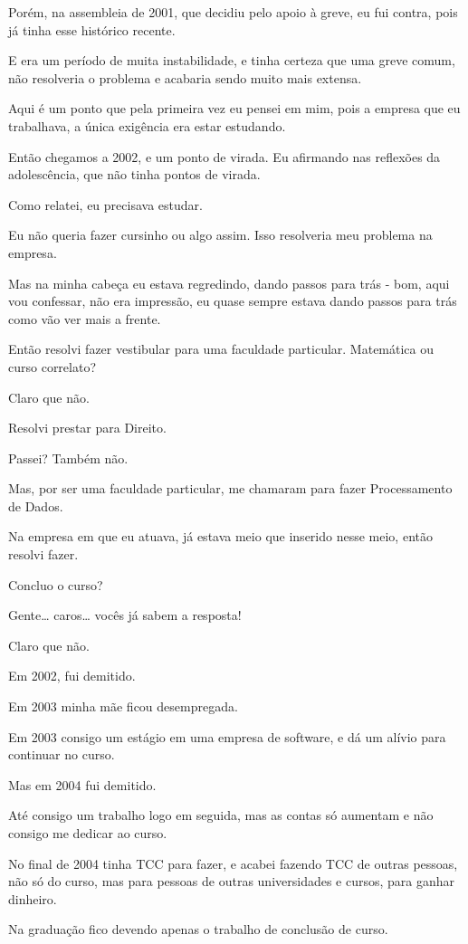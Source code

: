 Porém, na assembleia de 2001, que decidiu pelo apoio à greve, eu fui contra, pois já tinha esse histórico recente. 

E era um período de muita instabilidade, e tinha certeza que uma greve comum, não resolveria o problema e acabaria sendo muito mais extensa. 

Aqui é um ponto que pela primeira vez eu pensei em mim, pois a empresa que eu trabalhava, a única exigência era estar estudando.

Então chegamos a 2002, e um ponto de virada. Eu afirmando nas reflexões da adolescência, que não tinha pontos de virada.

Como relatei, eu precisava estudar. 

Eu não queria fazer cursinho ou algo assim. Isso resolveria meu problema na empresa. 

Mas na minha cabeça eu estava regredindo, dando passos para trás - bom, aqui vou confessar, não era impressão, eu quase sempre estava dando passos para trás como vão ver mais a frente. 

Então resolvi fazer vestibular para uma faculdade particular. Matemática ou curso correlato?

Claro que não. 

Resolvi prestar para Direito. 

Passei? Também não. 

Mas, por ser uma faculdade particular, me chamaram para fazer Processamento de Dados. 

Na empresa em que eu atuava, já estava meio que inserido nesse meio, então resolvi fazer.

Concluo o curso? 

Gente… caros… vocês já sabem a resposta! 

Claro que não. 

Em 2002, fui demitido. 

Em 2003 minha mãe ficou desempregada.  

Em 2003 consigo um estágio em uma empresa de software, e dá um alívio para continuar no curso. 

Mas em 2004 fui demitido.

Até consigo um trabalho logo em seguida, mas as contas só aumentam e não consigo me dedicar ao curso. 

No final de 2004 tinha TCC para fazer, e acabei fazendo TCC de outras pessoas, não só do curso, mas para pessoas de outras universidades e cursos, para ganhar dinheiro. 

Na graduação fico devendo apenas o trabalho de conclusão de curso. 

